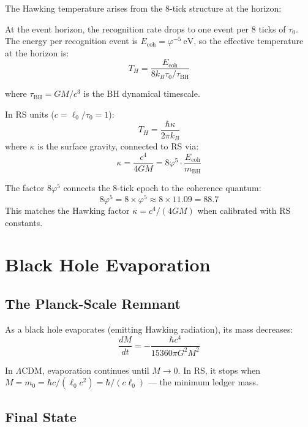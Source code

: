 \documentclass[12pt,a4paper]{article}
\theoremstyle{definition}
\theoremstyle{remark}
\begin{document}
The Hawking temperature arises from the 8-tick structure at the horizon:

At the event horizon, the recognition rate drops to one event per 8 ticks of $\tau_0$.
The energy per recognition event is $E_\mathrm{coh} = \varphi^{-5}~\mathrm{eV}$, 
so the effective temperature at the horizon is:
\begin{equation}
T_H = \frac{E_\mathrm{coh}}{8 k_B \tau_0 / \tau_\mathrm{BH}}
\end{equation}

where $\tau_\mathrm{BH} = GM/c^3$ is the BH dynamical timescale.

In RS units ($c = \ell_0/\tau_0 = 1$):
\begin{equation}
T_H = \frac{\hbar \kappa}{2\pi k_B}
\end{equation}
where $\kappa$ is the surface gravity, connected to RS via:
\begin{equation}
\kappa = \frac{c^4}{4GM} = 8\varphi^5 \cdot \frac{E_\mathrm{coh}}{m_\mathrm{BH}}
\end{equation}

The factor $8\varphi^5$ connects the 8-tick epoch to the coherence quantum:
\begin{equation}
8\varphi^5 = 8 \times \varphi^5 \approx 8 \times 11.09 = 88.7
\end{equation}
This matches the Hawking factor $\kappa = c^4/(4GM)$ when calibrated with RS constants.

\section{Black Hole Evaporation}

\subsection{The Planck-Scale Remnant}

As a black hole evaporates (emitting Hawking radiation), its mass decreases:
\begin{equation}
\frac{dM}{dt} = -\frac{\hbar c^4}{15360 \pi G^2 M^2}
\end{equation}

In $\Lambda$CDM, evaporation continues until $M \to 0$. In RS, it stops when 
$M = m_0 = \hbar c / (\ell_0 c^2) = \hbar/(c\ell_0)$ — the minimum ledger mass.

\subsection{Final State}
\end{document}
